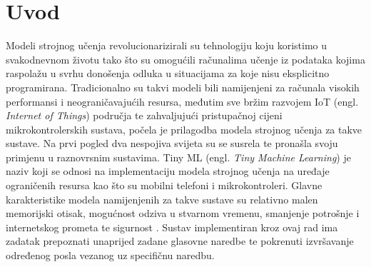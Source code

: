 \chapter{Uvod}
\label{pog:uvod}


Modeli strojnog učenja revolucionarizirali su tehnologiju koju koristimo u svakodnevnom
životu tako što su omogućili računalima učenje iz podataka kojima raspolažu u svrhu
donošenja odluka u situacijama za koje nisu eksplicitno programirana. Tradicionalno
su takvi modeli bili namijenjeni za računala visokih performansi i neograničavajućih
resursa, međutim sve bržim razvojem IoT (engl. \textit{Internet of Things}) područja te
zahvaljujući pristupačnoj cijeni mikrokontrolerskih sustava, počela je prilagodba
modela strojnog učenja za takve sustave. Na prvi pogled dva nespojiva svijeta
su se susrela te pronašla svoju primjenu u raznovrsnim sustavima.
Tiny ML (engl. \textit{Tiny Machine Learning}) je naziv koji se odnosi na implementaciju
modela strojnog učenja na uređaje ograničenih resursa kao što su mobilni telefoni
i mikrokontroleri. Glavne karakteristike modela namijenjenih za takve sustave su
relativno malen memorijski otisak, mogućnost odziva u stvarnom vremenu,
smanjenje potrošnje i internetskog prometa te sigurnost \cite{tinyml}. Sustav
implementiran kroz ovaj rad ima zadatak prepoznati unaprijed zadane glasovne
naredbe te pokrenuti izvršavanje određenog posla vezanog uz specifičnu naredbu.


